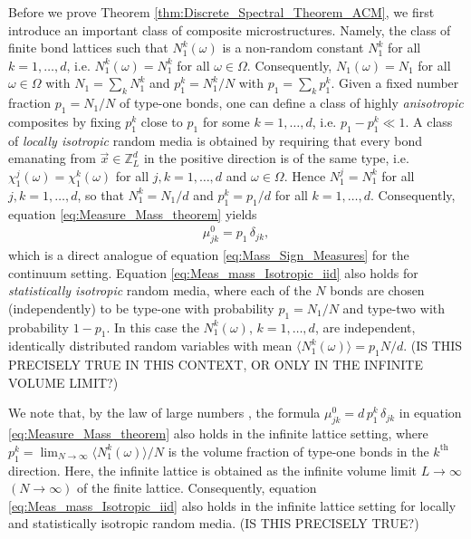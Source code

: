 \documentclass{cmslatex}
\begin{document}
Before we prove Theorem \ref{thm:Discrete_Spectral_Theorem_ACM}, we
first introduce an important class of composite
microstructures. Namely, the class of finite bond lattices such that
$N_1^k(\omega)$ is a non-random constant $N_1^k$ for all $k=1,\ldots,d$,
i.e. $N_1^k(\omega)=N_1^k$ for all $\omega\in\Omega$. Consequently, $N_1(\omega)=N_1$ for
all $\omega\in\Omega$ with $N_1=\sum_kN_1^k$ and $p_1^k=N_1^k/N$
with $p_1=\sum_kp_1^k$. Given a fixed number fraction $p_1=N_1/N$ of type-one
bonds, one can define a class of highly \emph{anisotropic} composites
by fixing $p_1^k$ close to $p_1$ for some $k=1,\ldots,d$,
i.e. $p_1-p_1^k\ll1$. A class of \emph{locally isotropic} random media is 
obtained by requiring that every bond emanating from
$\vec{x}\in\mathbb{Z}^d_L$ in the positive direction is of the same
type, i.e. $\chi_1^j(\omega)=\chi_1^k(\omega)$ for all $j,k=1,\ldots,d$ and $\omega\in\Omega$. Hence
$N_1^j=N_1^k$ for all $j,k=1,\ldots,d$, so that $N_1^k=N_1/d$ and
$p_1^k=p_1/d$ for all $k=1,\ldots,d$. Consequently, equation
\eqref{eq:Measure_Mass_theorem} yields
% 
\begin{align}\label{eq:Meas_mass_Isotropic_iid}
  \mu_{jk}^0=p_1\,\delta_{jk},
\end{align}
%
which is a direct analogue of equation \eqref{eq:Mass_Sign_Measures}
for the continuum setting.  Equation
\eqref{eq:Meas_mass_Isotropic_iid} also holds for \emph{statistically 
isotropic} random media, where each of the $N$ bonds are chosen
(independently) to be type-one with probability $p_1=N_1/N$ and
type-two with probability $1-p_1$. In this case the $N_1^k(\omega)$,
$k=1,\ldots,d$, are independent, identically distributed random variables
with mean $\langle N_1^k(\omega)\rangle=p_1N/d$. (IS THIS PRECISELY TRUE IN THIS
CONTEXT, OR ONLY IN THE INFINITE VOLUME LIMIT?) 


We note that, by the law of large numbers
\cite{Durrett:Book:Probability}, the formula
$\mu_{jk}^0=d\,p_1^k\,\delta_{jk}$ in equation
\eqref{eq:Measure_Mass_theorem} also holds in the infinite lattice
setting, where $p_1^k=\lim_{N\to\infty}\langle N_1^k(\omega)\rangle/N$ is the volume fraction 
of type-one bonds in the $k^{\text{th}}$ direction. Here, the infinite
lattice is obtained as the infinite volume limit $L\to\infty$ $(N\to\infty)$ of the
finite lattice. Consequently, equation
\eqref{eq:Meas_mass_Isotropic_iid} also holds in the infinite lattice
setting for locally and statistically isotropic random media. (IS THIS
PRECISELY TRUE?)  
\end{document}
